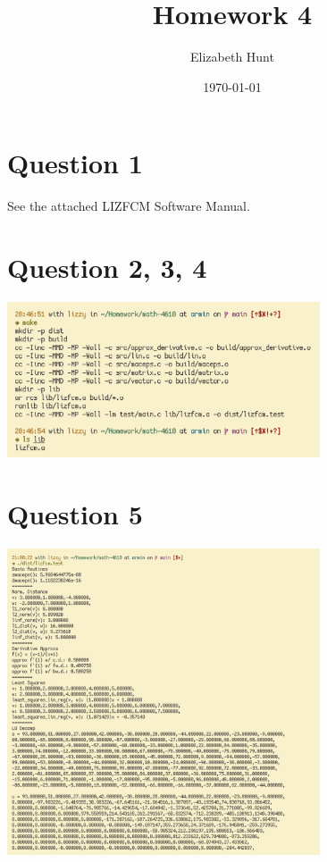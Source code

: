 \documentclass[11pt]{article}
\author{Elizabeth Hunt}
\date{\today}
\title{Homework 4}
\begin{document}
\maketitle
\setlength\parindent{0pt}

\section{Question 1}
\label{sec:orgf7348d4}
See the attached LIZFCM Software Manual.

\section{Question 2, 3, 4}
\label{sec:orgaf52510}
\begin{center}
\includegraphics[width=350px]{./img/make_run.png}
\end{center}

\section{Question 5}
\label{sec:orgd0fe6e8}
\begin{center}
\includegraphics[width=350px]{./img/test_routine_1.png}
\end{center}
\end{document}
